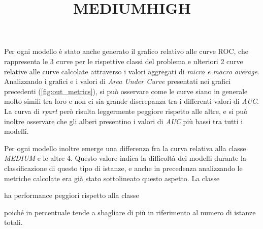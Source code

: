     Per ogni modello è stato anche generato il grafico relativo alle curve ROC, che rappresenta le 3 curve per le rispettive classi del problema e ulteriori 2 curve relative alle curve calcolate attraverso i valori aggregati di \textit{micro e macro average}.
    Analizzando i grafici e i valori di \textit{Area Under Curve} presentati nei grafici precedenti (\ref{fig:out_metrics}), si può osservare come le curve siano in generale molto simili tra loro e non ci sia grande discrepanza tra i differenti valori di \textit{AUC}. La curva di \textit{rpart} però risulta leggermente peggiore rispetto alle altre, e si può inoltre osservare che gli alberi presentino i valori di \textit{AUC} più bassi tra tutti i modelli.
    
    Per ogni modello inoltre emerge una differenza fra la curva relativa alla classe \textit{MEDIUM} e le altre 4. Questo valore indica la difficoltà dei modelli durante la classificazione di questo tipo di istanze, e anche in precedenza analizzando le metriche calcolate era già stato sottolineato questo aspetto. La classe \title{MEDIUM} ha performance peggiori rispetto alla classe \title{HIGH} poiché in percentuale tende a sbagliare di più in riferimento al numero di istanze totali.
    
    
